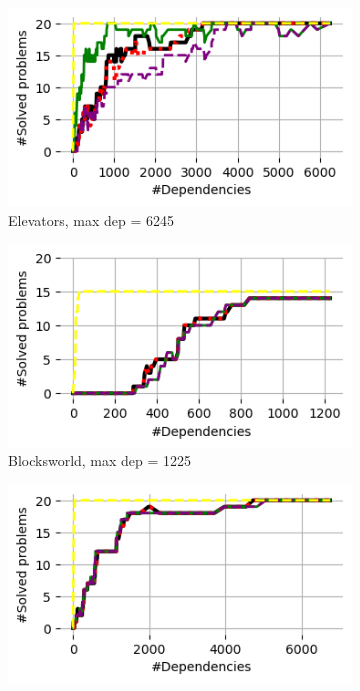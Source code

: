 \documentclass{article}
\theoremstyle{remark}
\begin{document}
\begin{figure}[t!]
\centering
\begin{subfigure}[b]{0.3\textwidth}
\centering
  \includegraphics[width=1\linewidth]{Results_graphs/MAFS/coverage_MAFS_Elevators}
  \caption{Elevators, max dep = 6245}
  \label{fig:ElevatorsMAFS}
\end{subfigure}\hspace{1em}
\begin{subfigure}[b]{0.3\textwidth}
\centering
  \includegraphics[width=1\linewidth]{Results_graphs/MAFS/coverage_MAFS_BlocksWorld}
  \caption{Blocksworld, max dep = 1225}
  \label{fig:BlocksworldMAFS}
\end{subfigure}\hspace{1em}
\begin{subfigure}[b]{0.3\textwidth}
\centering
  \includegraphics[width=1\linewidth]{Results_graphs/MAFS/coverage_MAFS_Depot}

\end{subfigure}
\end{figure}
\end{document}
